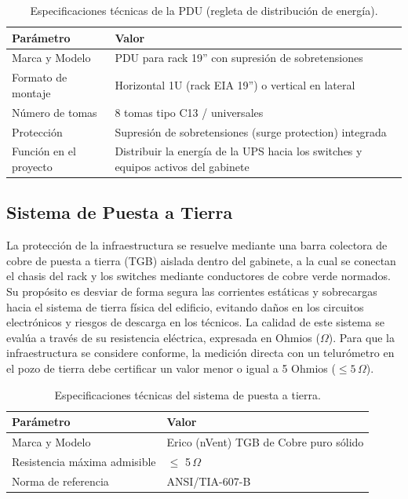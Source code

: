 \begin{table}[H]
\centering
\caption{Especificaciones técnicas de la PDU (regleta de distribución de energía).}
\label{tab:spec_pdu}
\begin{tabular}{lp{9cm}}
\hline
\textbf{Parámetro} & \textbf{Valor} \\
\hline
Marca y Modelo & PDU para rack 19'' con supresión de sobretensiones \\
Formato de montaje & Horizontal 1U (rack EIA 19'') o vertical en lateral \\
Número de tomas & 8 tomas tipo C13 / universales \\
Protección & Supresión de sobretensiones (surge protection) integrada \\
Función en el proyecto & Distribuir la energía de la UPS hacia los switches y equipos activos del gabinete \\
\hline
\end{tabular}
\end{table}

\subsection{Sistema de Puesta a Tierra}
La protección de la infraestructura se resuelve mediante una barra colectora de cobre de puesta a tierra (TGB) aislada dentro del gabinete, a la cual se conectan el chasis del rack y los switches mediante conductores de cobre verde normados.
Su propósito es desviar de forma segura las corrientes estáticas y sobrecargas hacia el sistema de tierra física del edificio, evitando daños en los circuitos electrónicos y riesgos de descarga en los técnicos.
La calidad de este sistema se evalúa a través de su resistencia eléctrica, expresada en Ohmios ($\Omega$).
Para que la infraestructura se considere conforme, la medición directa con un telurómetro en el pozo de tierra debe certificar un valor menor o igual a 5 Ohmios ($\le 5\,\Omega$).

\begin{table}[H]
\centering
\caption{Especificaciones técnicas del sistema de puesta a tierra.}
\label{tab:spec_tierra}
\begin{tabular}{lp{9cm}}
\hline
\textbf{Parámetro} & \textbf{Valor} \\
\hline
Marca y Modelo & Erico (nVent) TGB de Cobre puro sólido \\
Resistencia máxima admisible & $\le$ 5\,$\Omega$ \\
Norma de referencia & ANSI/TIA-607-B \\
\hline
\end{tabular}
\end{table}

